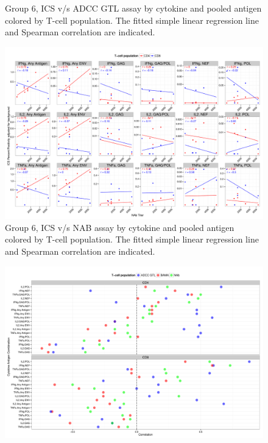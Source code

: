 \documentclass[11pt]{article}\usepackage[]{graphicx}\usepackage[]{color}
\makeatletter
\def\maxwidth{ %
  \ifdim\Gin@nat@width>\linewidth
    \linewidth
  \else
    \Gin@nat@width
  \fi
}
\newenvironment{knitrout}{}{} %
\makeatother
\begin{document}
\begin{landscape}
\begin{figure}[H]
\begin{center}
\begin{knitrout}
\end{knitrout}
\caption{Group 6, ICS v/s ADCC GTL assay by cytokine and pooled antigen colored by T-cell population. The fitted simple linear regression line and Spearman correlation are indicated.}
\end{center}
\end{figure}


\begin{figure}[H]
\begin{center}
\begin{knitrout}
\color{fgcolor}
\includegraphics[width=\maxwidth]{figure/corrplot_Grp6_NAb_pooledAntigen-1} 

\end{knitrout}
\caption{Group 6, ICS v/s NAB assay by cytokine and pooled antigen colored by T-cell population. The fitted simple linear regression line and Spearman correlation are indicated.}
\end{center}
\end{figure}




\begin{figure}[H]
\begin{center}
\begin{knitrout}
\color{fgcolor}
\includegraphics[width=\maxwidth]{figure/corrplot_Grp5-1} 


\end{knitrout}
\end{center}
\end{figure}
\end{landscape}
\end{document}
